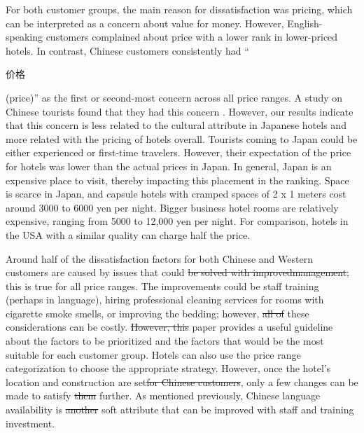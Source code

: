 \documentclass[smallextended,natbib]{svjour3}       %
\providecommand{\DIFadd}[1]{{\protect\color{blue}\uwave{#1}}} %
\providecommand{\DIFdel}[1]{{\protect\color{red}\sout{#1}}}                      %
\providecommand{\DIFaddbegin}{} %
\providecommand{\DIFaddend}{} %
\providecommand{\DIFdelbegin}{} %
\providecommand{\DIFdelend}{} %
\newcommand{\DIFscaledelfig}{0.5}
\newlength{\DIFdelgraphicswidth} %
\newlength{\DIFdelgraphicsheight} %
\newcommand{\DIFaddincludegraphics}[2][]{{\color{blue}\fbox{\DIFOincludegraphics[#1]{#2}}}} %
\newcommand{\DIFdelincludegraphics}[2][]{%
\sbox{\DIFdelgraphicsbox}{\DIFOincludegraphics[#1]{#2}}%
\settoboxwidth{\DIFdelgraphicswidth}{\DIFdelgraphicsbox} %
\settoboxtotalheight{\DIFdelgraphicsheight}{\DIFdelgraphicsbox} %
\scalebox{\DIFscaledelfig}{%
\parbox[b]{\DIFdelgraphicswidth}{\usebox{\DIFdelgraphicsbox}\\[-\baselineskip] \rule{\DIFdelgraphicswidth}{0em}}\llap{\resizebox{\DIFdelgraphicswidth}{\DIFdelgraphicsheight}{%
\setlength{\unitlength}{\DIFdelgraphicswidth}%
\begin{picture}(1,1)%
\thicklines\linethickness{2pt} %
{\color[rgb]{1,0,0}\put(0,0){\framebox(1,1){}}}%
{\color[rgb]{1,0,0}\put(0,0){\line( 1,1){1}}}%
{\color[rgb]{1,0,0}\put(0,1){\line(1,-1){1}}}%
\end{picture}%
}\hspace*{3pt}}} %
} %
\DeclareRobustCommand{\DIFaddbegin}{\DIFOaddbegin \let\includegraphics\DIFaddincludegraphics} %
\DeclareRobustCommand{\DIFaddend}{\DIFOaddend \let\includegraphics\DIFOincludegraphics} %
\DeclareRobustCommand{\DIFdelbegin}{\DIFOdelbegin \let\includegraphics\DIFdelincludegraphics} %
\DeclareRobustCommand{\DIFdelend}{\DIFOaddend \let\includegraphics\DIFOincludegraphics} %
\begin{document}
    For both customer groups, the main reason for dissatisfaction was pricing, which can be interpreted as a concern about value for money. However, English-speaking customers complained about price with a lower rank in lower-priced hotels. In contrast, Chinese customers consistently had ``\begin{CJK}{UTF8}{gbsn}价格\end{CJK} (price)'' as the first or second-most concern across all price ranges. A study on Chinese tourists found that they had this concern \cite[][]{truong2009}. However, our results indicate that this concern is less related to the cultural attribute in Japanese hotels and more related with the pricing of hotels overall. Tourists coming to Japan could be either experienced or first-time travelers. However, their expectation of the price for hotels was lower than the actual prices in Japan. In general, Japan is an expensive place to visit, thereby impacting this placement in the ranking. Space is scarce in Japan, and capsule hotels with cramped spaces of 2 x 1 meters cost around 3000 to 6000 yen per night. Bigger business hotel rooms are relatively expensive, ranging from 5000 to 12,000 yen per night. For comparison, hotels in the USA with a similar quality can charge half the price.

    Around half of the dissatisfaction factors for both Chinese and Western customers are caused by issues that could \DIFdelbegin \DIFdel{be solved with improvedmanagement}\DIFdelend \DIFaddbegin \DIFadd{improved}\DIFaddend ; this is true for all price ranges. The improvements could be staff training (perhaps in language), hiring professional cleaning services for rooms with cigarette smoke smells, or improving the bedding; however, \DIFdelbegin \DIFdel{all of }\DIFdelend these considerations can be costly. \DIFdelbegin \DIFdel{However, this }\DIFdelend \DIFaddbegin \DIFadd{This }\DIFaddend paper provides a useful guideline about the factors to be prioritized and the factors that would be the most suitable for each customer group. Hotels can also use the price range categorization to choose the appropriate strategy. However, once the hotel's location and construction are set\DIFdelbegin \DIFdel{for Chinese customers}\DIFdelend , only a few changes can be made to satisfy \DIFdelbegin \DIFdel{them }\DIFdelend \DIFaddbegin \DIFadd{Chinese customers }\DIFaddend further. As mentioned previously, Chinese language availability is \DIFdelbegin \DIFdel{another }\DIFdelend \DIFaddbegin \DIFadd{a }\DIFaddend soft attribute that can be improved with staff and training investment.
\end{document}
